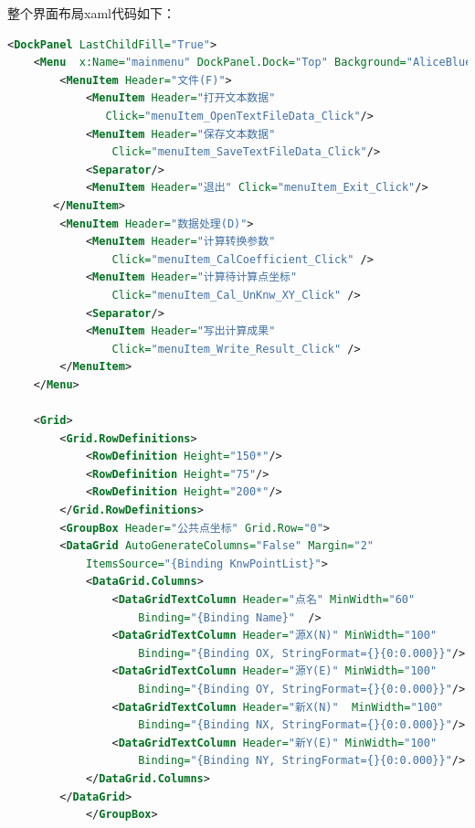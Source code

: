 整个界面布局xaml代码如下：
\begin{lstlisting}[language=xml]
<DockPanel LastChildFill="True">
    <Menu  x:Name="mainmenu" DockPanel.Dock="Top" Background="AliceBlue">
        <MenuItem Header="文件(F)">
            <MenuItem Header="打开文本数据"
               Click="menuItem_OpenTextFileData_Click"/>
            <MenuItem Header="保存文本数据"
                Click="menuItem_SaveTextFileData_Click"/>
            <Separator/>
            <MenuItem Header="退出" Click="menuItem_Exit_Click"/>
       </MenuItem>
        <MenuItem Header="数据处理(D)">
            <MenuItem Header="计算转换参数" 
                Click="menuItem_CalCoefficient_Click" />
            <MenuItem Header="计算待计算点坐标" 
                Click="menuItem_Cal_UnKnw_XY_Click" />
            <Separator/>
            <MenuItem Header="写出计算成果" 
                Click="menuItem_Write_Result_Click" />
        </MenuItem>
    </Menu>

    <Grid>
        <Grid.RowDefinitions>
            <RowDefinition Height="150*"/>
            <RowDefinition Height="75"/>
            <RowDefinition Height="200*"/>
        </Grid.RowDefinitions>
        <GroupBox Header="公共点坐标" Grid.Row="0">
        <DataGrid AutoGenerateColumns="False" Margin="2" 
            ItemsSource="{Binding KnwPointList}">
            <DataGrid.Columns>
                <DataGridTextColumn Header="点名" MinWidth="60"
                    Binding="{Binding Name}"  />
                <DataGridTextColumn Header="源X(N)" MinWidth="100"
                    Binding="{Binding OX, StringFormat={}{0:0.000}}"/>
                <DataGridTextColumn Header="源Y(E)" MinWidth="100"
                    Binding="{Binding OY, StringFormat={}{0:0.000}}"/>
                <DataGridTextColumn Header="新X(N)"  MinWidth="100"
                    Binding="{Binding NX, StringFormat={}{0:0.000}}"/>
                <DataGridTextColumn Header="新Y(E)" MinWidth="100"
                    Binding="{Binding NY, StringFormat={}{0:0.000}}"/>
            </DataGrid.Columns>
        </DataGrid>
            </GroupBox>


\end{lstlisting}
